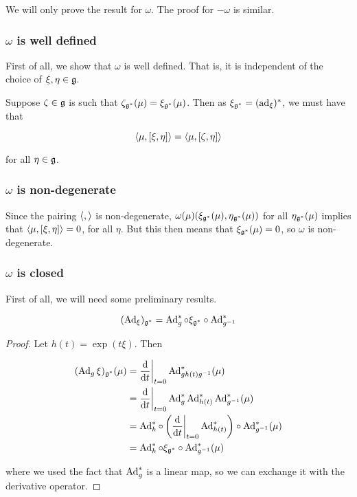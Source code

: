 \documentclass{article}
\begin{document}
We will only prove the result for \(\omega\). The proof for \(-\omega\) is similar.

\subsubsection{\(\omega\) is well defined}

First of all, we show that \(\omega\) is well defined. That is, it is independent of the choice of \(\xi, \eta \in \mathfrak{g}\).

Suppose \(\zeta \in \mathfrak{g}\) is such that \(\zeta_{\mathfrak{g}^*}(\mu) = \xi_{\mathfrak{g}^*}(\mu)\). Then as \(\xi_{\mathfrak{g}^*} = (\operatorname{ad}_\xi)^*\), we must have that

\[\left\langle \mu, [\xi, \eta] \right\rangle = \left\langle \mu, [\zeta, \eta] \right\rangle\]

for all \(\eta \in \mathfrak{g}\).

\subsubsection{\(\omega\) is non-degenerate}

Since the pairing \(\left\langle , \right\rangle\) is non-degenerate, \(\omega(\mu)(\xi_{\mathfrak{g}^*}(\mu), \eta_{\mathfrak{g}^*}(\mu))\) for all \(\eta_{\mathfrak{g}^*}(\mu)\) implies that \(\left\langle \mu, [\xi, \eta] \right\rangle = 0\), for all \(\eta\). But this then means that \(\xi_{\mathfrak{g}^*}(\mu) = 0\), so \(\omega\) is non-degenerate.

\subsubsection{\(\omega\) is closed}

First of all, we will need some preliminary results.

\begin{lemma}
    \[(\operatorname{Ad}_\xi)_{\mathfrak{g}^*} = \operatorname{Ad}_g^* \circ \xi_{\mathfrak{g}^*} \circ \operatorname{Ad}_{g^{-1}}^*\]
\end{lemma}

\begin{proof}
    Let \(h(t) = \exp(t\xi)\). Then

    \begin{align*}
        (\operatorname{Ad}_g\xi)_{\mathfrak{g}^*}(\mu) &= \dv{t}\bigg\vert_{t=0}\operatorname{Ad}^*_{gh(t)g^{-1}}(\mu) \\
        &= \dv{t}\bigg\vert_{t=0}\operatorname{Ad}^*_g\operatorname{Ad}^*_{h(t)}\operatorname{Ad}^*_{g^{-1}}(\mu) \\
        &= \operatorname{Ad}_h^* \circ \left(\dv{t}\bigg\vert_{t=0}\operatorname{Ad}_{h(t)}^*\right) \circ \operatorname{Ad}_{g^{-1}}^*(\mu) \\
        &= \operatorname{Ad}_h^* \circ \xi_{\mathfrak{g}^*} \circ \operatorname{Ad}_{g^{-1}}^*(\mu)
    \end{align*}

    where we used the fact that \(\operatorname{Ad}_g^*\) is a linear map, so we can exchange it with the derivative operator.
\end{proof}
\end{document}
